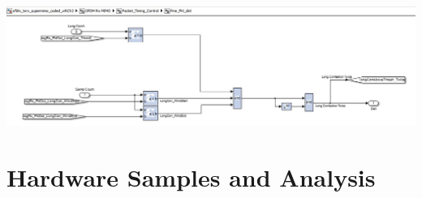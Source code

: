 \begin{center}
\includegraphics[width=\textwidth]{content/fig/fine_packetDetect.JPG}
\label{autocorrblock}
\end{center}

\section{Hardware Samples and Analysis}
\label{hw_samples}

